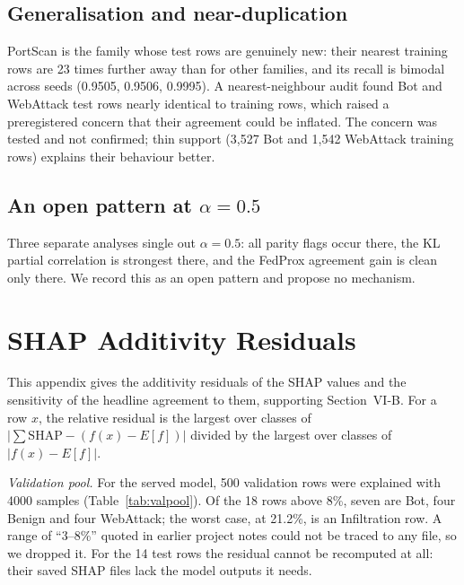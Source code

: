 \subsection{Generalisation and near-duplication}
PortScan is the family whose test rows are genuinely new: their nearest training rows
are 23 times further away than for other families, and its recall is bimodal across %
seeds (0.9505, 0.9506, 0.9995). A nearest-neighbour audit found Bot and WebAttack test %
rows nearly identical to training rows, which raised a preregistered concern that their
agreement could be inflated. The concern was tested and not confirmed; thin support
(3,527 Bot and 1,542 WebAttack training rows) explains their behaviour better. %

\subsection{An open pattern at $\alpha=0.5$}
Three separate analyses single out $\alpha=0.5$: all parity flags occur there, the KL %
partial correlation is strongest there, and the FedProx agreement gain is clean only
there. We record this as an open pattern and propose no mechanism.

\section{SHAP Additivity Residuals}
\label{app:resid}
This appendix gives the additivity residuals of the SHAP values and the sensitivity of
the headline agreement to them, supporting Section~VI-B. For a row $x$, the relative
residual is the largest over classes of $|\sum\mathrm{SHAP}-(f(x)-E[f])|$ divided by the
largest over classes of $|f(x)-E[f]|$.

\emph{Validation pool.} For the served model, 500 validation rows were explained with %
4000 samples (Table~\ref{tab:valpool}). Of the 18 rows above 8\%, seven are Bot, four %
Benign and four WebAttack; the worst case, at 21.2\%, is an Infiltration row. A range %
of ``3--8\%'' quoted in earlier project notes could not be traced to any file, so we %
dropped it. For the 14 test rows the residual cannot be recomputed at all: their saved %
SHAP files lack the model outputs it needs.

